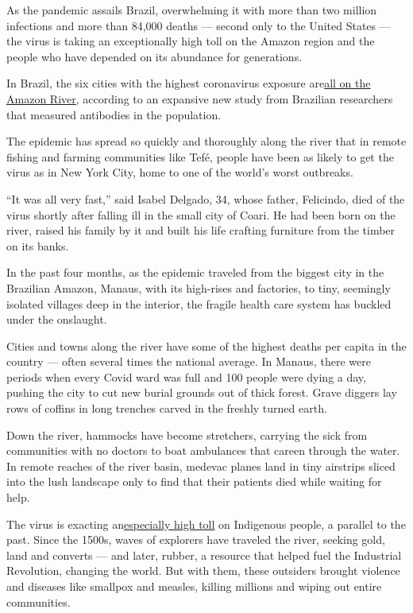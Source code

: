 As the pandemic assails Brazil, overwhelming it with more than two
million infections and more than 84,000 deaths --- second only to the
United States --- the virus is taking an exceptionally high toll on the
Amazon region and the people who have depended on its abundance for
generations.

In Brazil, the six cities with the highest coronavirus exposure
are\href{https://www.medrxiv.org/content/10.1101/2020.05.30.20117531v1}{}\href{https://www.medrxiv.org/content/10.1101/2020.05.30.20117531v1}{all
on the Amazon River,} according to an expansive new study from Brazilian
researchers that measured antibodies in the population.

The epidemic has spread so quickly and thoroughly along the river that
in remote fishing and farming communities like Tefé, people have been as
likely to get the virus as in New York City, home to one of the world's
worst outbreaks.

``It was all very fast,'' said Isabel Delgado, 34, whose father,
Felicindo, died of the virus shortly after falling ill in the small city
of Coari. He had been born on the river, raised his family by it and
built his life crafting furniture from the timber on its banks.

In the past four months, as the epidemic traveled from the biggest city
in the Brazilian Amazon, Manaus, with its high-rises and factories, to
tiny, seemingly isolated villages deep in the interior, the fragile
health care system has buckled under the onslaught.

Cities and towns along the river have some of the highest deaths per
capita in the country --- often several times the national average. In
Manaus, there were periods when every Covid ward was full and 100 people
were dying a day, pushing the city to cut new burial grounds out of
thick forest. Grave diggers lay rows of coffins in long trenches carved
in the freshly turned earth.

Down the river, hammocks have become stretchers, carrying the sick from
communities with no doctors to boat ambulances that careen through the
water. In remote reaches of the river basin, medevac planes land in tiny
airstrips sliced into the lush landscape only to find that their
patients died while waiting for help.

The virus is exacting
an\href{https://www.nytimes3xbfgragh.onion/2020/07/19/world/americas/coronavirus-brazil-indigenous.html?smid=tw-share}{}\href{https://www.nytimes3xbfgragh.onion/2020/07/19/world/americas/coronavirus-brazil-indigenous.html?smid=tw-share}{especially
high toll} on Indigenous people, a parallel to the past. Since the
1500s, waves of explorers have traveled the river, seeking gold, land
and converts --- and later, rubber, a resource that helped fuel the
Industrial Revolution, changing the world. But with them, these
outsiders brought violence and diseases like smallpox and measles,
killing millions and wiping out entire communities.

